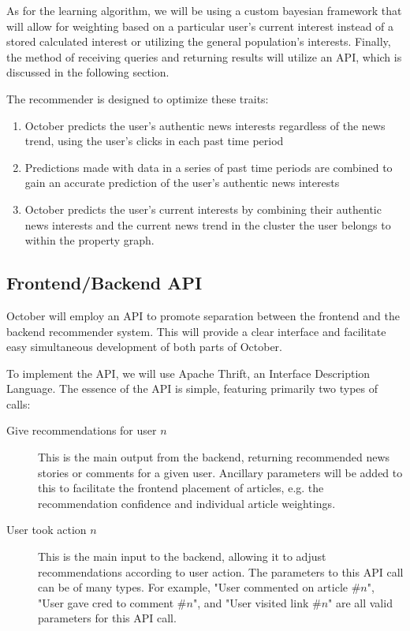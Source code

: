 \documentclass[11pt,letterpaper]{article}
\begin{document}
As for the learning algorithm, we will be using a custom
bayesian framework \cite{bayesian} that will allow for weighting based on a particular user's current interest instead of a stored calculated interest or utilizing the general population's interests.
Finally, the method of receiving queries and returning results will utilize an API, which is discussed in the following section.

The recommender is designed to optimize these traits:
    \begin{enumerate}
        \item October predicts the user’s authentic news interests regardless of the news trend, using the user’s clicks in each past time period
        \item Predictions made with data in a series of past time periods are combined to gain an accurate prediction of the user’s authentic news interests
        \item October predicts the user’s current interests by combining their authentic news interests and the current news trend in the cluster the user belongs to within the property graph.
    \end{enumerate}

\subsection{Frontend/Backend API}
\label{sec:api}
October will employ an API to promote separation between the frontend and the backend recommender system.
This will provide a clear interface and facilitate easy simultaneous development of both parts of October.

To implement the API, we will use Apache Thrift, an Interface Description Language\cite{thrift}.
The essence of the API is simple, featuring primarily two types of calls:
\begin{description}
\item[Give recommendations for user $n$]
This is the main output from the backend, returning recommended news stories or comments for a given user.
Ancillary parameters will be added to this to facilitate the frontend placement of articles, e.g. the recommendation confidence and individual article weightings.
\item[User took action $n$]
This is the main input to the backend, allowing it to adjust recommendations according to user action.
The parameters to this API call can be of many types. For example, "User commented on article \#$n$", "User gave cred to comment \#$n$", and "User visited link \#$n$" are all valid parameters for this API call.
\end{description}
\end{document}

